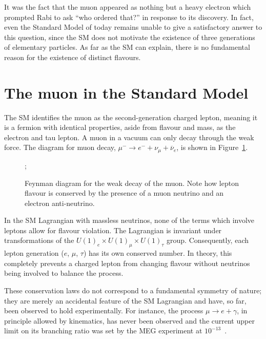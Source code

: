 It was the fact that the muon appeared as nothing but a heavy electron which
prompted Rabi to ask ``who ordered that?'' in response to its discovery. In
fact, even the Standard Model of today remains unable to give a satisfactory
answer to this question, since the SM does not motivate the existence of three
generations of elementary particles. As far as the SM can explain, there is no
fundamental reason for the existence of distinct flavours.

\section{The muon in the Standard Model}
% 
The SM identifies the muon as the second-generation charged lepton, meaning it
is a fermion with identical properties, aside from flavour and mass, as the electron
and tau lepton. A muon in a vacuum can only decay through the weak force. The
diagram for muon decay, $\mu^- \rightarrow e^- +  \nu_\mu + \overline{\nu}_e$,
is shown in Figure~\ref{fig:weak_decay}.


\begin{figure}
    \centering
    ;

    \caption{ Feynman diagram for the weak decay of the muon. Note how lepton
        flavour is conserved by the presence of a muon neutrino and an electron
        anti-neutrino. }
    \label{fig:weak_decay}
\end{figure}

In the SM Lagrangian with massless neutrinos, none of the terms which involve
leptons allow for flavour violation. The Lagrangian is invariant under
transformations of the ${U(1)_e \times U(1)_\mu \times U(1)_\tau}$ group.
Consequently, each lepton generation ($e$, $\mu$, $\tau$) has its own conserved
number. In theory, this completely prevents a charged lepton from changing
flavour without neutrinos being involved to balance the process. 

These conservation laws do not correspond to a fundamental symmetry of nature;
they are merely an accidental feature of the SM Lagrangian and have, so far,
been observed to hold experimentally. 
For instance, the process ${\mu \rightarrow e + \gamma}$, in principle allowed
by kinematics, has never been observed and the current upper limit on its
branching ratio was set by the MEG experiment at
$10^{-13}$~\cite{mori2016final}. 



